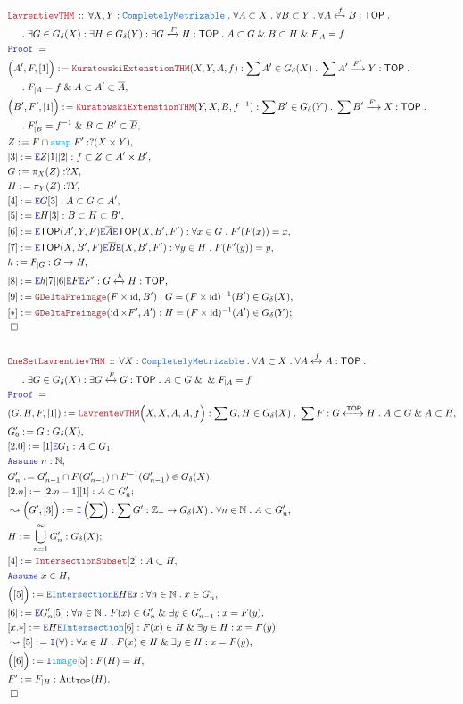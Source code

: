 \documentclass[12pt]{scrartcl}
\newcommand{\TYPE}[1]{\textcolor{NavyBlue}{\mathtt{#1}}}
\newcommand{\FUNC}[1]{\textcolor{Cerulean}{\mathtt{#1}}}
\newcommand{\LOGIC}[1]{\textcolor{Blue}{\mathtt{#1}}}
\newcommand{\THM}[1]{\textcolor{Maroon}{\mathtt{#1}}}
\renewcommand{\.}{\; . \;}
\newcommand{\de}{: \kern 0.1pc =}
\newcommand{\Act}[1]{\left( #1 \right)}
\newcommand{\Theorem}[2]{& \THM{#1} \, :: \, #2 \\ & \Proof = \\ }
\newcommand{\NewLine}{\\ & \kern 1pc}
\newcommand{\Page}[1]{ \begin{align*} #1 \end{align*}   }
\renewcommand{\And}{\; \& \;}
\newcommand{\Intro}{\LOGIC{I}}
\newcommand{\Elim}{\LOGIC{E}}
\newcommand{\Int}{\mathbb{Z} }
\newcommand{\Nat}{\mathbb{N} }
\DeclareMathOperator*{\id}{id}
\newcommand{\Aut}{\mathrm{Aut}}
\newcommand{\ToIso}{\xleftrightarrow}
\newcommand{\Arrow}{\xrightarrow}
\newcommand{\Say}[3]{& #1 \de #2 : #3, \\}
\newcommand{\SayIn}[3]{& #1 \de #2 \in #3, \\}
\newcommand{\Conclude}[3]{& #1 \de #2 : #3; \\}
\newcommand{\Derive}[3]{& \leadsto #1 \de #2 : #3, \\}
\newcommand{\Assume}[2]{& \LOGIC{Assume} \; #1 : #2, \\}
\newcommand{\AssumeIn}[2]{& \LOGIC{Assume} \; #1 \in #2, \\}
\newcommand{\QED}{\; \square}
\newcommand{\EndProof}{& \QED \\}
\newcommand{\Proof}{\LOGIC{Proof} \; }
\newcommand{\TOP}{\mathsf{TOP}}
\begin{document}
\Page{
	\Theorem{LavrentievTHM}
	{
		\forall X,Y : \TYPE{CompletelyMetrizable} \.
		\forall A \subset X \.
		\forall B \subset Y \.
		\forall A \ToIso{f} B : \TOP \. \NewLine \.
		\exists G \in G_\delta(X) :
		\exists H \in G_\delta(Y) :
		\exists  G \ToIso{F} H : \TOP \.
		A \subset G \And B \subset H \And F_{|A} = f
	}
	\Say{\Big(A',F,[1]\Big)}
	{
		\THM{KuratowskiExtenstionTHM}(X,Y,A,f)
	}
	{
		\sum A' \in G_\delta(X) \. 
		\sum A' \Arrow{F'} Y : \TOP \.
		\NewLine \.
		F_{|A} = f \And A \subset A' \subset \overline{A}
	}
	\Say{\Big(B',F',[1]\Big)}
	{
		\THM{KuratowskiExtenstionTHM}(Y,X,B,f^{-1})
	}
	{
		\sum B' \in G_\delta(Y) \. 
		\sum B' \Arrow{F'} X : \TOP \.
		\NewLine \.
		F'_{|B} = f^{-1} \And B \subset B' \subset \overline{B}
	}
	\Say{Z}{F \cap \FUNC{swap}\; F'  }{?(X \times Y)}
	\Say{[3]}{\Elim Z [1][2]}{ f \subset Z \subset A' \times B'}
	\Say{G}{\pi_X(Z)}{?X}
	\Say{H}{\pi_Y(Z)}{?Y}
	\Say{[4]}{\Elim G [3]}{ A \subset G \subset A'}
	\Say{[5]}{\Elim H [3]}{ B \subset H \subset B'}
	\Say{[6]}{\Elim \TOP(A',Y,F) \Elim \overline{A} \Elim \TOP(X,B',F')}
	{
		\forall x \in G \. F'(F(x)) = x
	}
	\Say{[7]}{\Elim \TOP(X,B',F)\Elim \overline{B}\Elim(X,B',F') }
	{
		\forall y \in H \. F(F'(y)) = y
	}
	\Say{h}{F_{|G}}{G \to H}
	\Say{[8]}{\Elim h [7][6] \Elim F \Elim F'}{G \ToIso{h} H : \TOP}
	\Say{[9]}{\THM{GDeltaPreimage}(F \times \id,B')}{G =  (F \times \id)^{-1}(B') \in G_\delta(X)}
	\Conclude{[*]}{\THM{GDeltaPreimage}(\id \times F',A')}{H = (F \times \id)^{-1}(A') \in G_\delta(Y)}
	\EndProof
	\\
	\Theorem{OneSetLavrentievTHM}
	{
		\forall X : \TYPE{CompletelyMetrizable} \.
		\forall A \subset X \.
		\forall A \ToIso{f} A : \TOP \. \NewLine \.
		\exists G \in G_\delta(X) :
		\exists  G \ToIso{F} G : \TOP \.
		A \subset G \And \And F_{|A} = f
	}
	\Say{(G,H,F,[1])}
	{
		\THM{LavrentevTHM}\Big(X,X,A,A,f\Big)
	}
	{
		\sum G,H \in G_\delta(X) \.
		\sum F : G \ToIso{\TOP} H \. 
		A \subset G \And A \subset H
	}
	\Say{G_0'}{G}{G_\delta(X)}
	\Say{[2.0]}{[1]\Elim G_1}{A \subset G_1}
	\Assume{n}{\Nat}
	\SayIn{G_n'}
	{
		G_{n-1}' \cap F(G_{n-1}') \cap F^{-1}(G_{n-1}')
	}
	{
		G_\delta(X)
	}
	\Conclude{[2.n]}{[2.n-1][1]}
	{
		A \subset G_n'
	}
	\Derive{\Big(G',[3]\Big)}{\Intro\Act{\sum}}{ \sum G' : \Int_+ \to G_\delta(X) \. \forall n \in \Nat \. A \subset G_n' }
	\Conclude{H}{\bigcup^\infty_{n=1} G_n'}
	{   
		G_\delta(X)
	}
	\Say{[4]}{\THM{IntersectionSubset}[2]}{A \subset H}
	\AssumeIn{x}{H}
	\Say{\Big( [5] \Big)}{\Elim \TYPE{Intersection} \Elim H \Elim x}
	{
		\forall  n \in \Nat \. x \in G_n'
	}
	\Say{[6]}{\Elim G_n' [5]}{\forall n \in \Nat \. F(x) \in G_n' \And \exists y \in G_{n-1}' : x = F(y) }
	\Conclude{[x.*]}{\Elim H \Elim \TYPE{Intersection}  [6]}{ F(x) \in H \And \exists y \in H : x = F(y) }
	\Derive{[5]}{\Intro(\forall)}{\forall x \in H \. F(x) \in H \And \exists y \in H : x = F(y)}
	\Say{\Big([6]\Big)}{\Intro \FUNC{image}[5]}{ F(H) = H}
	\Say{F'}{F_{|H}}{\Aut_\TOP(H)}
	\EndProof
}
\newpage
\end{document}
